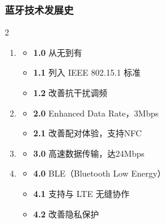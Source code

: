 

\begin{frame}
    \frametitle{蓝牙技术发展史}
    \begin{multicols}{2}
        \begin{enumerate}
          \item {}
            \begin{itemize}
              \item {\bfseries 1.0} 从无到有
              \item {\bfseries 1.1} 列入 IEEE 802.15.1 标准
              \item {\bfseries 1.2} 改善抗干扰调频
            \end{itemize}
          \item {}
            \begin{itemize}
              \item {\bfseries 2.0} Enhanced Data Rate，3Mbps
              \item {\bfseries 2.1} 改善配对体验，支持NFC
            \end{itemize}
          \item {}
            \begin{itemize}
              \item {\bfseries 3.0} 高速数据传输，达24Mbps 
            \end{itemize}
          \item {}
            \begin{itemize}
              \item {\bfseries 4.0} BLE（Bluetooth Low Energy）
              \item {\bfseries 4.1} 支持与 LTE 无缝协作
              \item {\bfseries 4.2} 改善隐私保护
            \end{itemize}

\end{enumerate}
\end{multicols}
\end{frame}
